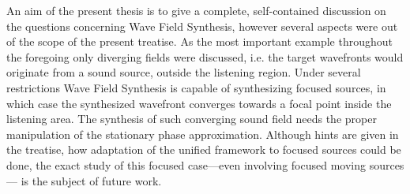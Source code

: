 \vspace{3mm}
An aim of the present thesis is to give a complete, self-contained discussion on the questions concerning Wave Field Synthesis, however several aspects were out of the scope of the present treatise.
As the most important example throughout the foregoing only diverging fields were discussed, i.e. the target wavefronts would originate from a sound source, outside the listening region.
Under several restrictions Wave Field Synthesis is capable of synthesizing focused sources, in which case the synthesized wavefront converges towards a focal point inside the listening area.
The synthesis of such converging sound field needs the proper manipulation of the stationary phase approximation.
Although hints are given in the treatise, how adaptation of the unified framework to focused sources could be done, the exact study of this focused case---even involving focused moving sources--- is the subject of future work.